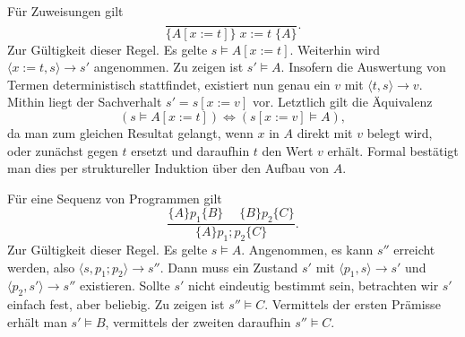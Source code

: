  Für Zuweisungen gilt
\[\dfrac{}{\{A[x:=t]\}\; x := t\;\{A\}}.\]
Zur Gültigkeit dieser Regel. Es gelte $s\models A[x:=t]$. Weiterhin
wird $\langle x:=t,s\rangle\to s'$ angenommen. Zu zeigen ist $s'\models A$.
Insofern die Auswertung von Termen deterministisch stattfindet, existiert
nun genau ein $v$ mit $\langle t,s\rangle\to v$. Mithin liegt der
Sachverhalt $s'=s[x:=v]$ vor. Letztlich gilt die Äquivalenz
\[(s\models A[x:=t])\Leftrightarrow (s[x:=v]\models A),\]
da man zum gleichen Resultat gelangt, wenn $x$ in $A$ direkt mit $v$
belegt wird, oder zunächst gegen $t$ ersetzt und daraufhin $t$ den
Wert $v$ erhält. Formal bestätigt man dies per struktureller
Induktion über den Aufbau von $A$.

Für eine Sequenz von Programmen gilt
\[\dfrac{\{A\}p_1\{B\}\quad\;\{B\}p_2\{C\}}{\{A\}p_1; p_2\{C\}}.\]
Zur Gültigkeit dieser Regel. Es gelte $s\models A$. Angenommen,
es kann $s''$ erreicht werden, also $\langle s,p_1; p_2\rangle\to s''$.
Dann muss ein Zustand $s'$ mit $\langle p_1,s\rangle\to s'$ und
$\langle p_2,s'\rangle\to s''$ existieren. Sollte $s'$ nicht eindeutig
bestimmt sein, betrachten wir $s'$ einfach fest, aber beliebig. Zu zeigen
ist $s''\models C$. Vermittels der ersten Prämisse erhält man
$s'\models B$, vermittels der zweiten daraufhin $s''\models C$.

